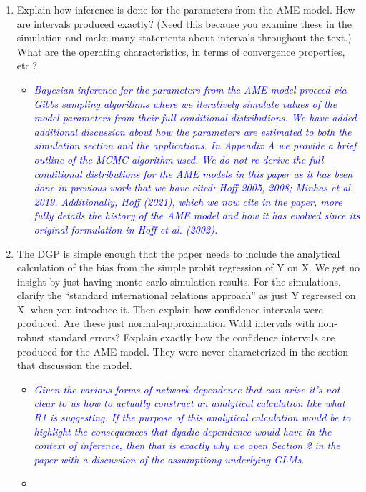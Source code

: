 \begin{enumerate}
\begin{itemize}
{{		}}
	\end{itemize}
	\item Explain how inference is done for the parameters from the AME model. How are intervals produced exactly? (Need this because you examine these in the simulation and make many statements about intervals throughout the text.)  What are the operating characteristics, in terms of convergence properties, etc.?
	\begin{itemize}
		\item  \emph{ \textcolor{blue}{
		Bayesian inference for the parameters from the AME model proceed via Gibbs sampling algorithms where we iteratively simulate values of the model parameters from their full conditional distributions. We have added additional discussion about how the parameters are estimated to both the simulation section and the applications. In Appendix A we provide a brief outline of the MCMC algorithm used. We do not re-derive the full conditional distributions for the AME models in this paper as it has been done in previous work that we have cited: Hoff 2005, 2008; Minhas et al. 2019. Additionally, Hoff (2021), which we now cite in the paper, more fully details the history of the AME model and how it has evolved since its original formulation in Hoff et al. (2002).
		}}
	\end{itemize}
	\item The DGP is simple enough that the paper needs to include the analytical calculation of the bias from the simple probit regression of Y on X.  We get no insight by just having monte carlo simulation results. For the simulations, clarify the ``standard international relations approach'' as just Y regressed on X, when you introduce it. Then explain how confidence intervals were produced. Are these just normal-approximation Wald intervals with non-robust standard errors? Explain exactly how the confidence intervals are produced for the AME model.  They were never characterized in the section that discussion the model.
	\begin{itemize}
		\item  \emph{ \textcolor{blue}{
		Given the various forms of network dependence that can arise it's not clear to us how to actually construct an analytical calculation like what R1 is suggesting. If the purpose of this analytical calculation would be to highlight the consequences that dyadic dependence would have in the context of inference, then that is exactly why we open Section 2 in the paper with a discussion of the assumptiong underlying GLMs. }}
		\item  \emph{ \textcolor{blue}{
}}
\end{itemize}
\end{enumerate}
